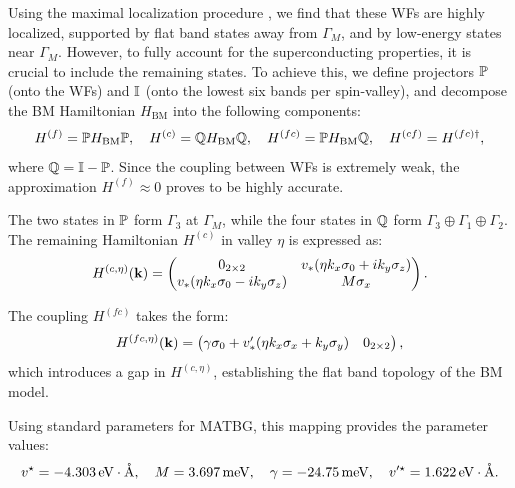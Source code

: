 \documentclass[12pt]{report}
\begin{document}
Using the maximal localization procedure \cite{maxlocalWFs_marzari2012, wannier90}, we find that these WFs are highly localized, supported by flat band states away from $\Gamma_M$, and by low-energy states near $\Gamma_M$. However, to fully account for the superconducting properties, it is crucial to include the remaining states. To achieve this, we define projectors $\bP$ (onto the WFs) and $\I$ (onto the lowest six bands per spin-valley), and decompose the BM Hamiltonian $H_\text{BM}$ into the following components:
\begin{equation} \label{eq:projected_hamiltonians_WFs_PQ}
H^{(f)} = \bP H_\text{BM} \bP, \quad H^{(c)} = \bQ H_\text{BM} \bQ, \quad H^{(fc)} = \bP H_\text{BM} \bQ, \quad H^{(cf)} = H^{(fc)\dagger},
\end{equation}
where $\bQ = \I - \bP$. Since the coupling between WFs is extremely weak, the approximation $H^{(f)} \approx 0$ proves to be highly accurate.

The two states in $\bP$ form $\Gamma_3$ at $\Gamma_M$, while the four states in $\bQ$ form $\Gamma_3 \oplus \Gamma_1 \oplus \Gamma_2$. The remaining Hamiltonian $H^{(c)}$ in valley $\eta$ is expressed as:
\begin{equation} \label{eq:H(c)_topoheavyfermion}
H^{(c, \eta)}(\k) =
\begin{pmatrix}
0_{2\times 2} & v_* (\eta k_x \sigma_0 + i k_y \sigma_z) \\
v_* (\eta k_x \sigma_0 - i k_y \sigma_z) & M \sigma_x
\end{pmatrix}.
\end{equation}

The coupling $H^{(fc)}$ takes the form:
\begin{equation} \label{eq:H(fc)_topoheavyfermion}
H^{(fc, \eta)}(\k) =
\begin{pmatrix}
\gamma \sigma_0 + v'_* (\eta k_x \sigma_x + k_y \sigma_y) & 0_{2\times 2}
\end{pmatrix},
\end{equation}
which introduces a gap in $H^{(c, \eta)}$, establishing the flat band topology of the BM model.

Using standard parameters for MATBG, this mapping provides the parameter values:
\begin{equation} \label{eq:paramaters_topoheavyfermion}
v^\star = -4.303 \, \text{eV} \cdot \AA, \quad M = 3.697 \, \text{meV}, \quad \gamma = -24.75 \, \text{meV}, \quad v'^\star = 1.622 \, \text{eV} \cdot \AA.
\end{equation}
\end{document}
